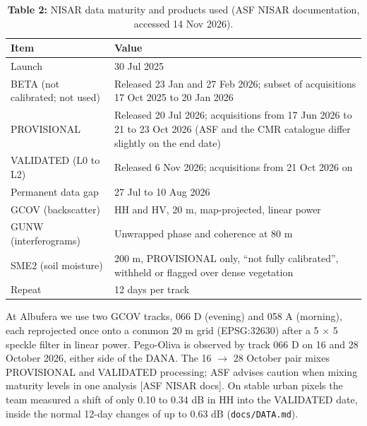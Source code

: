 \documentclass[10pt,twocolumn]{article}
\begin{document}
\begin{table}[tbp]
\centering
\caption{\textbf{Table 2:} NISAR data maturity and products used (ASF NISAR documentation, accessed 14 Nov 2026).}
\footnotesize
\begin{tabularx}{\textwidth}{LL}
\toprule
\textbf{Item} & \textbf{Value} \\
\midrule
{}Launch & 30 Jul 2025 \\
{}BETA (not calibrated; not used) & Released 23 Jan and 27 Feb 2026; subset of acquisitions 17 Oct 2025 to 20 Jan 2026 \\
{}PROVISIONAL & Released 20 Jul 2026; acquisitions from 17 Jun 2026 to 21 to 23 Oct 2026 (ASF and the CMR catalogue differ slightly on the end date) \\
{}VALIDATED (L0 to L2) & Released 6 Nov 2026; acquisitions from 21 Oct 2026 on \\
{}Permanent data gap & 27 Jul to 10 Aug 2026 \\
{}GCOV (backscatter) & HH and HV, 20 m, map-projected, linear power \\
{}GUNW (interferograms) & Unwrapped phase and coherence at 80 m \\
{}SME2 (soil moisture) & 200 m, PROVISIONAL only, ``not fully calibrated'', withheld or flagged over dense vegetation \\
{}Repeat & 12 days per track \\
\bottomrule
\end{tabularx}
\end{table}

At Albufera we use two GCOV tracks, 066 D (evening) and 058 A (morning), each reprojected once onto a common 20 m grid (EPSG:32630) after a 5 $\times$ 5 speckle filter in linear power. Pego-Oliva is observed by track 066 D on 16 and 28 October 2026, either side of the DANA. The 16 $\rightarrow$ 28 October pair mixes PROVISIONAL and VALIDATED processing; ASF advises caution when mixing maturity levels in one analysis [ASF NISAR docs]. On stable urban pixels the team measured a shift of only \textminus{}0.10 to \textminus{}0.34 dB in HH into the VALIDATED date, inside the normal 12-day changes of up to 0.63 dB (\texttt{docs/\allowbreak{}DATA.\allowbreak{}md}).
\end{document}
